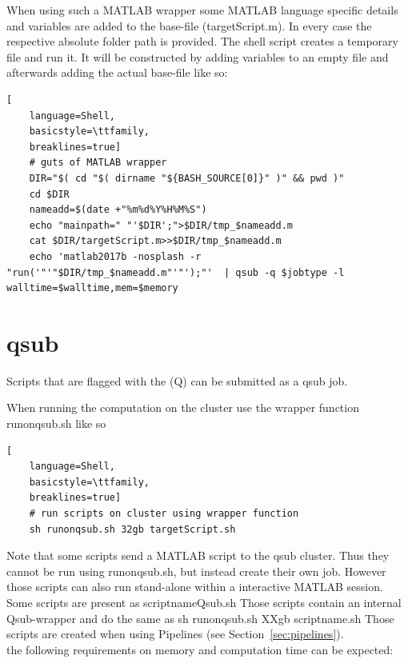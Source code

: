 \documentclass[12pt,a4paper]{scrartcl}
\begin{document}
\noindent When using such a MATLAB wrapper some MATLAB language specific details and variables are added to the base-file (targetScript.m). In every case the respective absolute folder path is provided. The shell script creates a temporary file and run it. It will be constructed by adding variables to an empty file and afterwards adding the actual base-file like so:
\begin{lstlisting}[
    language=Shell,
    basicstyle=\ttfamily,
    breaklines=true]
    # guts of MATLAB wrapper
    DIR="$( cd "$( dirname "${BASH_SOURCE[0]}" )" && pwd )"
    cd $DIR
    nameadd=$(date +"%m%d%Y%H%M%S")
    echo "mainpath=" "'$DIR';">$DIR/tmp_$nameadd.m
    cat $DIR/targetScript.m>>$DIR/tmp_$nameadd.m
    echo 'matlab2017b -nosplash -r "run('"'"$DIR/tmp_$nameadd.m"'"');"'  | qsub -q $jobtype -l walltime=$walltime,mem=$memory
\end{lstlisting}

\section{qsub}
Scripts that are flagged with the (Q) can be submitted as a qsub job.

\noindent When running the computation on the cluster use the wrapper function runonqsub.sh like so
\begin{lstlisting}[
    language=Shell,
    basicstyle=\ttfamily,
    breaklines=true]
    # run scripts on cluster using wrapper function
    sh runonqsub.sh 32gb targetScript.sh
\end{lstlisting}


\noindent Note that some scripts send a MATLAB script to the qsub cluster. Thus they cannot be run using runonqsub.sh, but instead create their own job. However those scripts can also run stand-alone within a interactive MATLAB session.\\

\noindent Some scripts are present as scriptnameQsub.sh Those scripts contain an internal Qsub-wrapper and do the same as sh runonqsub.sh XXgb scriptname.sh Those scripts are created when using Pipelines (see Section~\ref{sec:pipelines}).\\

\noindent the following requirements on memory and computation time can be expected:
\end{document}
